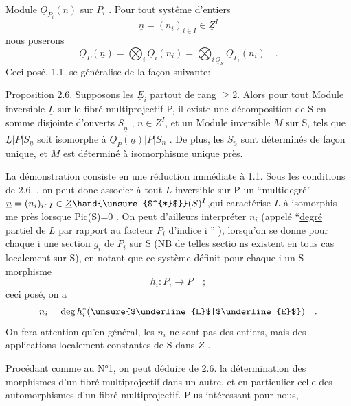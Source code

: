 
Module  $\underline{O}_{P_i}(n)$ sur $P_i$ . Pour tout systême d'entiers
\[ \underline{n} = (n_i)_{i \in I} \in \underline{Z}^I \]
nous  poserons
\[ \underline{O}_P(\underline{n}) = \bigotimes_i \underline{O}_i(n_i) = \bigotimes_{i\,\underline{O}_S} \underline{O}_{P_i}(n_i) \quad . \]
Ceci posé, 1.1. se généralise de la façon suivante:

\uline{Proposition} 2.6. Supposons les $\underline{E}_i$ partout de rang $\geq$2. Alors pour tout
Module inversible $\underline{L}$ sur le fibré multiprojectif P, il existe une
 décomposition de S en somme disjointe d'ouverts $\underline{S}_{\underline{n}}$ , $\underline{n} \in \underline{Z}^I$,
et  un Module inversible $\underline{M}$ sur S, tels que $\underline{L}|P|S_{\underline{n}}$
soit isomorphe à $\underline{O}_P(\underline{n})|P|S_n$ . De plus, les $S_{\underline{n}}$ sont déterminés de façon
unique, et  $\underline{M}$ est déterminé à isomorphisme unique près.

 La démonstration  consiste en une réduction immédiate à 1.1.
Sous les conditions de 2.6. , on peut donc associer à tout $\underline{L}$ inversible
sur P un ``multidegré'' $\underline{n} = (n_i)_{i \in I} \in \underline{Z}\hand{\unsure{$^{*}$}}(S)^I$,qui caractérise $\underline{L}$ à isomorphis
me près lorsque Pic(S)=0 . On peut d'ailleurs interpréter $n_i$ (appelé
``\uline{degré partiel} de $\underline{L}$ par rapport au facteur $P_i$ d'indice i '' ), lorsqu'on
se donne pour chaque i une section $g_i$ de $P_i$ sur S (NB de telles sectio
ns existent en tous cas localement sur S), en notant que ce système définit
pour chaque i un S-morphisme 
\[ h_i : P_i \longrightarrow P \quad ; \]
ceci posé, on a
\[ n_i = \deg h_i^{*}(\unsure{$\underline{L}$|$\underline{E}$}) \quad . \]
On fera attention qu'en général, les $n_i$ ne sont pas des entiers, mais des
applications localement constantes de S dans $\underline{Z}$ .

Procédant comme au N°1, on peut déduire de 2.6. la détermination des
morphismes d'un fibré multiprojectif dans un autre, et en particulier celle
des automorphismes d'un fibré multiprojectif. Plus intéressant pour nous,

